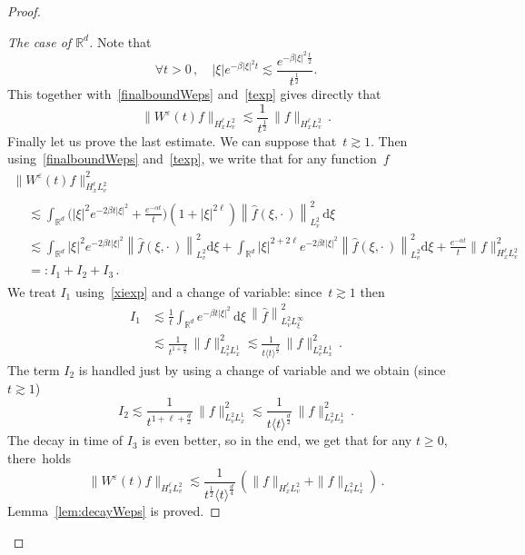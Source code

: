\documentclass[11pt]{article}
\theoremstyle{definition}
\numberwithin{equation}{section}
\numberwithin{figure}{section}
\numberwithin{table}{section}
\newcommand*{\dd}{\mathrm{d}}
\newcommand*{\dxi}{\dd \xi}
\newenvironment{laststep}[1]{\begin{proof}[#1]}{\end{proof}}
\newcommand*\R {\mathbb{R}}
\newcommand*\e{{\varepsilon}}
\let\oldforall\forall
\renewcommand*{\forall}{\mathrel{\oldforall}}
\begin{document}
\begin{proof}
\begin{laststep}{The case of $\R^d$} 
Note that
\begin{equation}\label{xiexp}
\forall t>0 \,, \quad |\xi| e^{-\beta |\xi|^2t} \lesssim \frac{e^{-\beta |\xi|^2\frac{t}{2}}}{t^\frac12}.
\end{equation}
This together with~\eqref{finalboundWeps} and~\eqref{texp} gives directly that
\[
\|W^\e(t) f\|_{H^\ell_xL^2_v} \lesssim \frac{1}{t^\frac12 } \, \|f\|_{H^\ell_xL^2_v}\,.
\]
Finally let us prove the last estimate. We can suppose that~$t \gtrsim 1$. Then using~\eqref{finalboundWeps} and~\eqref{texp}, we write that for any function~$f$
\begin{multline*}
\|W^\e(t) f\|^2_{H^\ell_xL^2_v} \\
\begin{aligned}
&\lesssim \int_{\R^d} \Big(|\xi|^2 e^{-2\beta t |\xi|^2} + \frac{e^{-\alpha t}}{t}\Big)(1+|\xi|^{2\ell}) \left\|\widehat f (\xi, \cdot\,)\right\|^2_{L^2_v} \, \dxi \\
&\lesssim \int_{\R^d} |\xi|^2 e^{-2\beta t |\xi|^2}\left\|\widehat f (\xi, \cdot\,)\right\|^2_{L^2_v} \! \dxi + \int_{\R^d} |\xi|^{2+2\ell} e^{-2\beta t |\xi|^2}\left\|\widehat f (\xi, \cdot\,)\right\|^2_{L^2_v} \! \dxi + \frac{e^{-\alpha t}}{t} \|f\|^2_{H^\ell_xL^2_v}\!\\
& =: I_1+I_2+I_3\,.
\end{aligned}
\end{multline*}
We treat $I_1$ using~\eqref{xiexp} and a change of variable: since~$t \gtrsim 1$ then
\begin{align*}
I_1 &\lesssim \frac{1}{t} \int_{\R^d} e^{-\beta t |\xi|^2} \, \dxi \, \left\|\widehat f \right\|^2_{L^2_v L^\infty_\xi} \\
&\lesssim \frac{1}{t^{1+\frac d2}} \, \|f\|^2_{L^2_vL^1_x} \lesssim \frac{1}{{t\langle t \rangle^{\frac d2}}} \, \|f\|^2_{L^2_vL^1_x}\,.
\end{align*}
The term $I_2$ is handled just by using a change of variable and we obtain (since~$t \gtrsim 1$)
\[
I_2 \lesssim \frac{1}{t^{1+\ell+\frac d2}} \, \|f\|^2_{L^2_vL^1_x} \lesssim \frac{1}{{t\langle t \rangle^{\frac d2}}} \, \|f\|^2_{L^2_vL^1_x}\,.
\]
The decay in time of $I_3$ is even better, so in the end, we get that for any $t \ge 0$, there~holds
\[
\|W^\e(t) f\|_{H^\ell_xL^2_v} \lesssim \frac{1}{{t^\frac12\langle t \rangle^{\frac d4}}} \, \left(\|f\|_{H^\ell_xL^2_v} +\|f\|_{L^2_vL^1_x}\right)\,.
\]
Lemma~\ref{lem:decayWeps} is proved.
\end{laststep}
\let\qed\relax
\end{proof}
\end{document}

